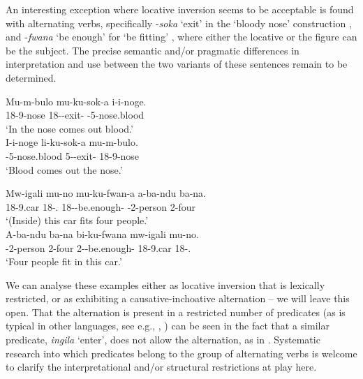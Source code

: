 \documentclass[output=paper]{langscibook}
\begin{document}
\z
\z

An interesting exception where locative inversion seems to be acceptable is found with alternating verbs, specifically -\textit{soka} ‘exit’ in the ‘bloody nose’ construction , and -\textit{fwana} ‘be enough’ for ‘be fitting’ , where either the locative or the figure can be the subject. The precise semantic and/or pragmatic differences in interpretation and use between the two variants of these sentences remain to be determined.

\ea
\label{bkm:Ref122598890}
\ea
\gll
Mu-m-bulo  mu-ku-sok-a  i-i-noge.\\
18-9-nose  18\SM{}-\PRS{}-exit-\FV{}  \AUG{}-5-nose.blood\\
\glt
‘In the nose comes out blood.’\\

\ex
\gll
I-i-noge  li-ku-sok-a  mu-m-bulo.\\
\AUG{}-5-nose.{blood}  5\SM{}-\PRS{}-exit-\FV{}  18-9-nose\\
\glt
‘Blood comes out the nose.’ \citep[162]{MsovelaEtAl2023}\\

\z
\z

\ea
\label{bkm:Ref122598897}
\ea
\gll
Mw-igali  mu-no  mu-ku-fwan-a  a-ba-ndu  ba-na.\\
18-9.car  18-\DEM.\PROX{}  18\SM{}-\PRS{}-be.enough-\FV{}  \AUG{}-2-person  2-four\\
\glt
‘(Inside) this car fits four people.’ \citep[162]{MsovelaEtAl2023}\\

\ex
\gll
A-ba-ndu  ba-na  bi-ku-fwana  mw-igali  mu-no.\\
\AUG{}-2-person  2-four  2\SM-\PRS{}-be.enough-\FV{}  18-9.car  18-\DEM.\PROX{}\\
\glt
‘Four people fit in this car.’\\

\z
\z

We can analyse these examples either as locative inversion that is lexically restricted, or as exhibiting a causative-inchoative alternation – we will leave this open. That the alternation is present in a restricted number of predicates (as is typical in other languages, see e.g., \citealt[3--7]{Haspelmath1993}, \citealt{Creissels2022}) can be seen in the fact that a similar predicate, \textit{ingila} ‘enter’, does not allow the alternation, as in . Systematic research into which predicates belong to the group of alternating verbs is welcome to clarify the interpretational and/or structural restrictions at play here.
\end{document}
